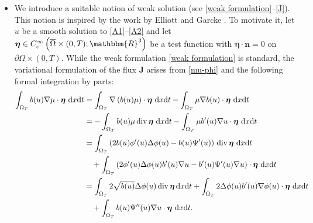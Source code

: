 \documentclass[11pt,  reqno]{amsart}%
\theoremstyle{plain}
\theoremstyle{definition}
\theoremstyle{remark}
\numberwithin{equation}{section}
\def\div{\,\mathrm{div}}
\newcommand{\dx}{\textup{d}x}
\newcommand{\dt}{\textup{d}t}
\begin{document}
\begin{itemize}

\item[1.] We introduce a suitable notion of weak solution (see \eqref{weak formulation}--\eqref{J}). This notion is inspired by the work by Elliott and Garcke \cite{EG1996}. To motivate it, let $u$ be a smooth solution to \eqref{A1}--\eqref{A2} and let $\boldsymbol{\eta} \in C_c^\infty\left( \overline{\Omega} \times (0,T); \mathbbm{R}^3\right)$ be a test function with $\boldsymbol{\eta} \cdot \mathbf{n}=0$ on $\partial \Omega \times(0,T)$.
While the weak formulation \eqref{weak formulation} is standard, the variational formulation of the flux $\boldsymbol{J}$ arises from \eqref{mu-phi} and the following formal integration by parts: 
\begin{align}
\int_{\Omega_T} b(u) \nabla \mu \cdot \boldsymbol{\eta}  \ \dx\dt
&= \int_{\Omega_T}  \nabla \left( b(u)\mu\right) \cdot \boldsymbol{\eta}  \ \dx\dt
-\int_{\Omega_T}  \mu \nabla b(u) \cdot \boldsymbol{\eta}  \ \dx\dt
\notag
\\
&=
- \int_{\Omega_T}  b(u)\mu  \div \, \boldsymbol{\eta}  \ \dx\dt
-\int_{\Omega_T}  \mu b'(u) \nabla u \cdot \boldsymbol{\eta}  \ \dx\dt
\notag
\\
&=
 \int_{\Omega_T}  \left( 2 b(u) \phi'(u) \Delta \phi(u) - b(u)\Psi'(u) \right)  \div \, \boldsymbol{\eta}  \ \dx\dt 
 \notag
 \\
 &\quad
 +\int_{\Omega_T}  \left(  2 \phi'(u) \Delta \phi(u) b'(u) \nabla u 
 - b'(u) \Psi'(u) \nabla u \right)  \cdot \boldsymbol{\eta}  \ \dx\dt 
 \notag
 \\
 &=
 \int_{\Omega_T}  2 \sqrt{b(u)} \Delta \phi(u)   \div \, \boldsymbol{\eta}  \, \dx\dt
 +\int_{\Omega_T}   2 \Delta \phi(u) b'(u) \nabla \phi(u) \cdot \boldsymbol{\eta} \ \dx\dt  
 \notag
 \\
 &\quad
 + \int_{\Omega_T} b(u) \Psi''(u) \nabla u  \cdot \boldsymbol{\eta}  \ \dx\dt.
 \notag
\end{align}


\end{itemize}
\end{document}
